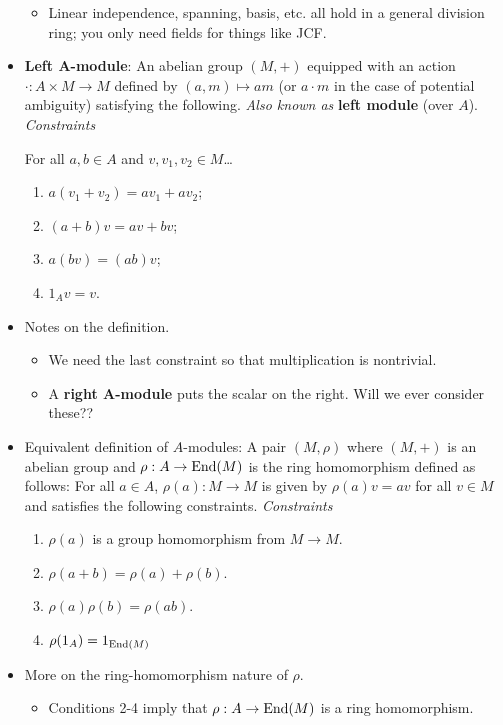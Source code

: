 \documentclass[../notes.tex]{subfiles}
\begin{document}
\begin{itemize}
\begin{itemize}
        \item Linear independence, spanning, basis, etc. all hold in a general division ring; you only need fields for things like JCF.
    \end{itemize}
    \item \textbf{Left $\bm{A}$-module}: An abelian group $(M,+)$ equipped with an action $\cdot:A\times M\to M$ defined by $(a,m)\mapsto am$ (or $a\cdot m$ in the case of potential ambiguity) satisfying the following. \emph{Also known as} \textbf{left module} (over $A$). \emph{Constraints}\par
    For all $a,b\in A$ and $v,v_1,v_2\in M$\dots
    \begin{enumerate}[label={(\arabic*)}]
        \item $a(v_1+v_2)=av_1+av_2$;
        \item $(a+b)v=av+bv$;
        \item $a(bv)=(ab)v$;
        \item $1_Av=v$.
    \end{enumerate}
    \item Notes on the definition.
    \begin{itemize}
        \item We need the last constraint so that multiplication is nontrivial.
        \item A \textbf{right $\bm{A}$-module} puts the scalar on the right. Will we ever consider these??
    \end{itemize}
    \item Equivalent definition of $A$-modules: A pair $(M,\rho)$ where $(M,+)$ is an abelian group and $\rho:A\to\operatorname{End}(M)$ is the ring homomorphism defined as follows: For all $a\in A$, $\rho(a):M\to M$ is given by $\rho(a)v=av$ for all $v\in M$ and satisfies the following constraints. \emph{Constraints}
    \begin{enumerate}[label={(\arabic*)}]
        \item $\rho(a)$ is a group homomorphism from $M\to M$.
        \item $\rho(a+b)=\rho(a)+\rho(b)$.
        \item $\rho(a)\rho(b)=\rho(ab)$.
        \item $\rho(1_A)=1_{\operatorname{End}(M)}$
    \end{enumerate}
    \item More on the ring-homomorphism nature of $\rho$.
    \begin{itemize}
        \item Conditions 2-4 imply that $\rho:A\to\operatorname{End}(M)$ is a ring homomorphism.

\end{itemize}
\end{itemize}
\end{document}
